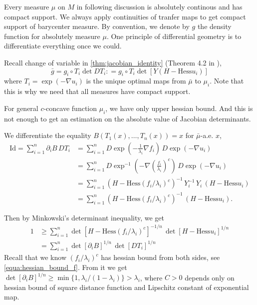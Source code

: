 Every measure $\mu$ on $M$ in following discussion is absolutely continous and has compact support.
We always apply continuities of tranfer maps to get compact support of barycenter measure.
By convention, we denote by $g$ the density function for absolutely measure $\mu$.
One principle of differential geometry is to differentiate everything once we could.

Recall change of variable in \cref{thm:jacobian_identity} (Theorem 4.2 in \cite{cordero2001riemannian}),
\[
	\bar{g} = g_i \circ T_i \det D T_i :
	= g_i \circ T_i \det[Y(H-\text{Hess} u_i)]
\]
where $T_i = \exp(-\nabla u_i)$ is the unique optimal maps from $\bar{\mu}$ to $\mu_i$.
Note that this is why we need that all measures have compact support.

For general $c$-concave function $\mu_i$, we have only upper hessian bound.
And this is not enough to get an estimation on the absolute value of Jacobian determinants.

We differentiate the equality $B(T_1(x), \ldots, T_n(x))=x$ for $\bar{\mu}$-a.e. $x$,
\begin{align*}
	\text{Id} =\sum_{i=1}^n \partial_i B\, DT_i
	 & =\sum_{i=1}^n D \exp(-\frac{1}{\lambda_i}\nabla f_i) \, D \exp(-\nabla u_i)                     \\
	 & =\sum_{i=1}^n D \exp^{-1}(-\nabla \left( \frac{f_i}{\lambda_i}\right)^c) \, D \exp(-\nabla u_i) \\
	 & =\sum_{i=1}^n(H-\text{Hess}(f_i / \lambda_i)^c)^{-1}\,Y_i^{-1}\,
	Y_i\,(H-\text{Hess} u_i)                                                                           \\
	 & =\sum_{i=1}^n(H-\text{Hess}(f_i / \lambda_i)^c)^{-1}\,
	(H-\text{Hess}u_i) .
\end{align*}

Then by Minkowski's determinant inequality, we get
\begin{align*}
	1 & \geq \sum_{i=1}^{n} \det [H-\text{Hess}(f_i/\lambda_i)^c]^{-1/n}\,\det[H-\text{Hess}u_i]^{1/n} \\
	  & =\sum_{i=1}^n \det[\partial_i B]^{1/n}\,\det[DT_i]^{1/n}
\end{align*}
Recall that we know $(f_i / \lambda_i)^c$ has hessian bound from both sides, see \cref{equa:hessian_bound_f}.
From it we get $\det[\partial_i B]^{1/n} \geq \min \{1, \lambda_i / (1 - \lambda_i)\} > \lambda_i$,
where $C > 0$ depends only on hessian bound of square distance function and Lipschitz constant of exponential map.

